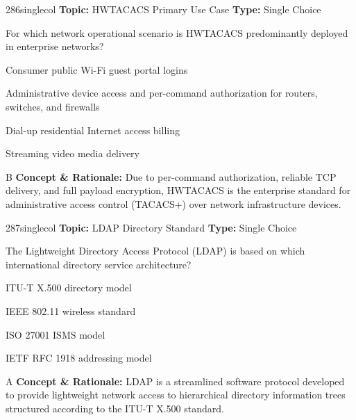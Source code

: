 \begin{qcard}{286}{singlecol}
\textcolor{darkslate!75}{\small\textbf{Topic:} HWTACACS Primary Use Case \hfill \textbf{Type:} Single Choice}\vspace{0.4em}\par
For which network operational scenario is HWTACACS predominantly deployed in enterprise networks?
\begin{qoptions}
\item Consumer public Wi-Fi guest portal logins
\item Administrative device access and per-command authorization for routers, switches, and firewalls
\item Dial-up residential Internet access billing
\item Streaming video media delivery
\end{qoptions}
\end{qcard}
\nopagebreak
\begin{explainbox}{B}
\textbf{Concept \& Rationale:} Due to per-command authorization, reliable TCP delivery, and full payload encryption, HWTACACS is the enterprise standard for administrative access control (TACACS+) over network infrastructure devices.
\end{explainbox}

\begin{qcard}{287}{singlecol}
\textcolor{darkslate!75}{\small\textbf{Topic:} LDAP Directory Standard \hfill \textbf{Type:} Single Choice}\vspace{0.4em}\par
The Lightweight Directory Access Protocol (LDAP) is based on which international directory service architecture?
\begin{qoptions}
\item ITU-T X.500 directory model
\item IEEE 802.11 wireless standard
\item ISO 27001 ISMS model
\item IETF RFC 1918 addressing model
\end{qoptions}
\end{qcard}
\nopagebreak
\begin{explainbox}{A}
\textbf{Concept \& Rationale:} LDAP is a streamlined software protocol developed to provide lightweight network access to hierarchical directory information trees structured according to the ITU-T X.500 standard.
\end{explainbox}

